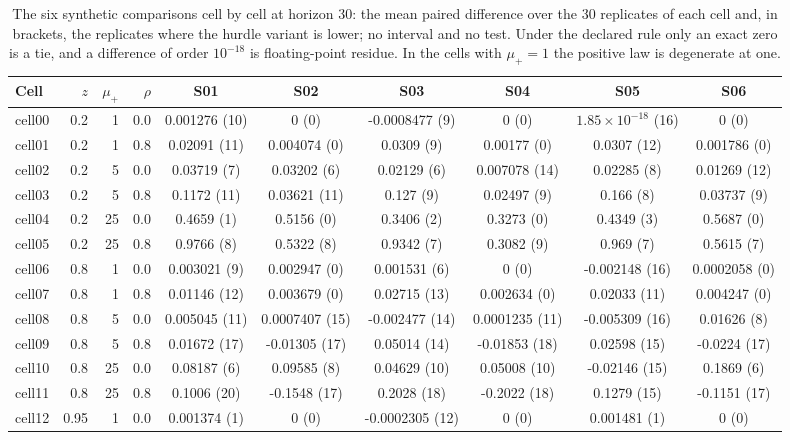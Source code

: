 \begin{table}[htbp]
\centering\footnotesize\setlength{\tabcolsep}{3.5pt}
\caption{The six synthetic comparisons cell by cell at horizon 30: the mean paired difference over the 30
replicates of each cell and, in brackets, the replicates where the hurdle variant is lower; no interval and
no test. Under the declared rule only an exact zero is a tie, and a difference of order $10^{-18}$ is
floating-point residue. In the cells with $\mu_{+} = 1$ the positive law is degenerate at one.}
\label{tab:s2cells}
\begin{tabular}{lrrrcccccc}
\toprule
Cell & $z$ & $\mu_{+}$ & $\rho$ & S01 & S02 & S03 & S04 & S05 & S06 \\
\midrule
cell00 & 0.2 & 1 & 0.0 & 0.001276 (10) & 0 (0) & -0.0008477 (9) & 0 (0) & $1.85 \times 10^{-18}$ (16) & 0 (0) \\
cell01 & 0.2 & 1 & 0.8 & 0.02091 (11) & 0.004074 (0) & 0.0309 (9) & 0.00177 (0) & 0.0307 (12) & 0.001786 (0) \\
cell02 & 0.2 & 5 & 0.0 & 0.03719 (7) & 0.03202 (6) & 0.02129 (6) & 0.007078 (14) & 0.02285 (8) & 0.01269 (12) \\
cell03 & 0.2 & 5 & 0.8 & 0.1172 (11) & 0.03621 (11) & 0.127 (9) & 0.02497 (9) & 0.166 (8) & 0.03737 (9) \\
cell04 & 0.2 & 25 & 0.0 & 0.4659 (1) & 0.5156 (0) & 0.3406 (2) & 0.3273 (0) & 0.4349 (3) & 0.5687 (0) \\
cell05 & 0.2 & 25 & 0.8 & 0.9766 (8) & 0.5322 (8) & 0.9342 (7) & 0.3082 (9) & 0.969 (7) & 0.5615 (7) \\
cell06 & 0.8 & 1 & 0.0 & 0.003021 (9) & 0.002947 (0) & 0.001531 (6) & 0 (0) & -0.002148 (16) & 0.0002058 (0) \\
cell07 & 0.8 & 1 & 0.8 & 0.01146 (12) & 0.003679 (0) & 0.02715 (13) & 0.002634 (0) & 0.02033 (11) & 0.004247 (0) \\
cell08 & 0.8 & 5 & 0.0 & 0.005045 (11) & 0.0007407 (15) & -0.002477 (14) & 0.0001235 (11) & -0.005309 (16) & 0.01626 (8) \\
cell09 & 0.8 & 5 & 0.8 & 0.01672 (17) & -0.01305 (17) & 0.05014 (14) & -0.01853 (18) & 0.02598 (15) & -0.0224 (17) \\
cell10 & 0.8 & 25 & 0.0 & 0.08187 (6) & 0.09585 (8) & 0.04629 (10) & 0.05008 (10) & -0.02146 (15) & 0.1869 (6) \\
cell11 & 0.8 & 25 & 0.8 & 0.1006 (20) & -0.1548 (17) & 0.2028 (18) & -0.2022 (18) & 0.1279 (15) & -0.1151 (17) \\
cell12 & 0.95 & 1 & 0.0 & 0.001374 (1) & 0 (0) & -0.0002305 (12) & 0 (0) & 0.001481 (1) & 0 (0) \\

\end{tabular}
\end{table}
